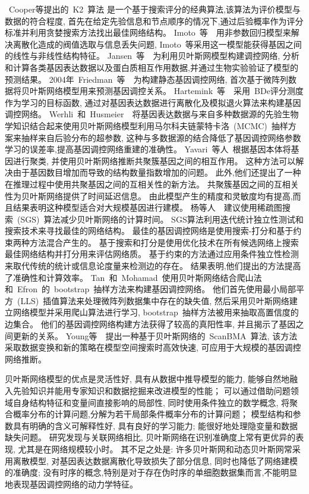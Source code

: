 ~Cooper等提出的~K2~算法\cite{cooper1992bayesian}
是一个基于搜索评分的经典算法,该算法为评价模型与数据的符合程度,
首先在给定先验信息和节点顺序的情况下,通过后验概率作为评分标准并利用贪婪搜索方法找出最佳网络结构。
Imoto~等~\cite{kim2003inferring}~用非参数回归模型来解决离散化造成的阀值选取与信息丢失问题,
Imoto~等采用这一模型能获得基因之间的线性与非线性结构特征。
Jansen~等~\cite{jansen2003bayesian}~为利用贝叶斯网模型构建调控网络,
分析和计算各类基因表达数据以及蛋白质相互作用数据,并通过生物实验验证了模型的预测结果。
2004年~Friedman~等~\cite{friedman2004inferring}~为构建静态基因调控网络,
首次基于微阵列数据将贝叶斯网络模型用来预测基因调控关系。
Hartemink~等~\cite{hartemink2005reverse}~采用~BDe评分测度作为学习的目标函数,
通过对基因表达数据进行离散化及模拟退火算法来构建基因调控网络。
Werhli~和~Husmeier~\cite{werhli2007reconstructing}~将基因表达数据与来自多种数据源的先验生物学知识结合起来使用贝叶斯网络模型利用马尔科夫链蒙特卡洛~(MCMC)~抽样方案来抽样来自后验分布的超参数,
这种与多数据源的结合降低了基因调控网络参数学习的误差率,提高基因调控网络重建的准确性。
Yavari~等人~\cite{yavari2008gene}根据基因本体将基因进行聚类,
并使用贝叶斯网络推断共聚簇基因之间的相互作用。
这种方法可以解决由于基因数目增加而导致的结构数量指数增加的问题。 
此外,他们还提出了一种在推理过程中使用共聚基因之间的互相关性的新方法。
共聚簇基因之间的互相关性为贝叶斯网络提供了时间延迟信息。 
由此模型产生的精度和灵敏度均有提高,而且结果表明这种模型适合对大规模基因进行建模。
杨等人~\cite{yang2011bayesian}~建议使用稀疏图搜索~(SGS)~算法减少贝叶斯网络的计算时间。
SGS算法利用迭代统计独立性测试和搜索技术来寻找最佳的网络结构。
最佳的基因调控网络是使用搜索-打分和基于约束两种方法混合产生的。
基于搜索和打分是使用优化技术在所有候选网络上搜索最佳网络结构并打分用来评估网络质。
基于约束的方法通过应用条件独立性检测来取代传统的统计或信息论度量来检测边的存在。
结果表明,他们提出的方法提高了准确性和计算效率。
Tan~和~Mohamad~\cite{kunga2012using}使用贝叶斯网络结合爬山法和~Efron~的~bootstrap~抽样方法来构建基因调控网络。
他们首先使用最小局部平方~(LLS)~插值算法来处理微阵列数据集中存在的缺失值, 
然后采用贝叶斯网络建立网络模型并采用爬山算法进行学习, 
bootstrap~抽样方法被用来抽取高置信度的边集合。
他们的基因调控网络构建方法获得了较高的真阳性率, 并且揭示了基因之间更新的关系。 
Young等~\cite{young2014fast}~提出一种基于贝叶斯网络的~ScanBMA~算法,
该方法采取数据变换和新的策略在模型空间搜索时高效快速,
可应用于大规模的基因调控网络推断。

贝叶斯网络模型的优点是灵活性好, 具有从数据中推导模型的能力, 能够自然地融入先验知识并能用专家知识和数据挖掘来改进模型的性能；
可以通过借助问题领域自身结构特征和变量间直接影响的局部性, 同时使用条件独立的数学概念, 将聚合概率分布的计算问题,分解为若干局部条件概率分布的计算问题；
模型结构和参数具有明确的含义可解释性好, 具有良好的学习能力; 能很好地处理隐变量和数据缺失问题。
研究发现与关联网络相比, 贝叶斯网络在识别准确度上常有更优异的表现, 尤其是在网络规模较小时。
其不足之处是: 许多贝叶斯网和动态贝叶斯网常采用离散模型, 对基因表达数据离散化导致损失了部分信息,
同时也降低了网络建模的准确度;
没有时序的概念,特别是对于存在伪时序的单细胞数据集而言,不能明显地表现基因调控网络的动力学特征。

